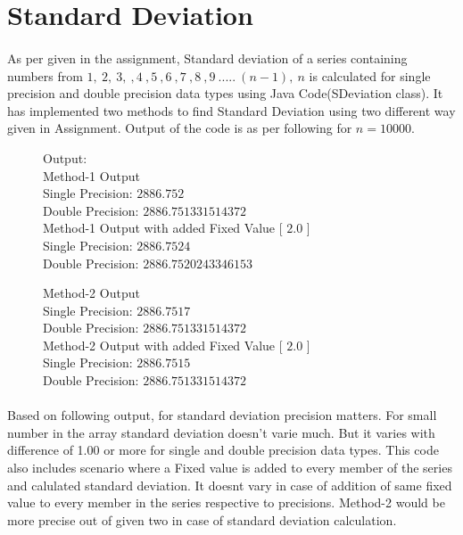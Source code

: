 \documentclass[12pt]{article}
\begin{document}
\newpage
\section{Standard Deviation}
\paragraph{}
As per given in the assignment, Standard deviation of a series containing numbers from $1, \ 2, \ 3, \ ,4 \ ,5 \ ,6 \ ,7 \ ,8 \ ,9 \ ..... \ (n-1), \ n$ is calculated for single precision and double precision data types using Java Code(SDeviation class). It has implemented two methods to find Standard Deviation using two different way given in Assignment. Output of the code is as per following for $n=10000$.

\begin{figure}[h]
	Output:\\
	Method-1 Output \\
	Single Precision: $2886.752$ \\
	Double Precision: $2886.751331514372$ \\
	Method-1 Output with added Fixed Value [ $2.0$ ] \\
	Single Precision: $2886.7524$ \\
	Double Precision: $2886.7520243346153$
\end{figure}

\begin{figure}[h]
	Method-2 Output \\
	Single Precision: $2886.7517$  \\
	Double Precision: $2886.751331514372$ \\
	Method-2 Output with added Fixed Value [ $2.0$ ] \\
	Single Precision: $2886.7515$ \\
	Double Precision: $2886.751331514372$
\end{figure}

\paragraph{} Based on following output, for standard deviation precision matters. For small number in the array standard deviation doesn't varie much. But it varies with difference of 1.00 or more for single and double precision data types. This code also includes scenario where a Fixed value is added to every member of the series and calulated standard deviation. It doesnt vary in case of addition of same fixed value to every member in the series respective to precisions. Method-2 would be more precise out of given two in case of standard deviation calculation.
\end{document}
